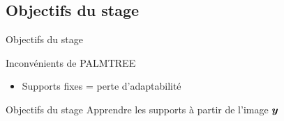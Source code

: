\subsection{Objectifs du stage}
\begin{frame}{Objectifs du stage}
\begin{alertblock}{Inconvénients de PALMTREE}
\begin{itemize}
\item Supports fixes = perte d'adaptabilité
\end{itemize}
\end{alertblock}
\begin{figure}\centering
\end{figure}
\begin{exampleblock}{Objectifs du stage}
Apprendre les supports à partir de l'image $\bm{y}$
\end{exampleblock}
\end{frame}




